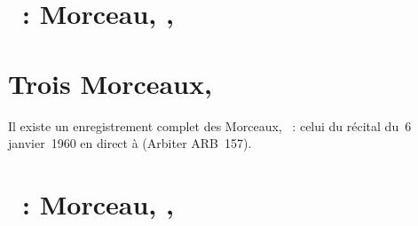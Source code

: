 \section{\ifChrono \Scriabine{}~: \fi
Morceau,  , }
\label{\thesection}

\begin{workitemize}
 \item{}
 \begin{perfitemize}
  \item{}
 \end{perfitemize}
\end{workitemize}

\section*{%
Trois Morceaux, }

Il existe un enregistrement complet des Morceaux, ~: celui du
récital du~6 janvier~1960 en direct à \MSHM (Arbiter ARB~157).

\section{\ifChrono \Scriabine{}~: \fi
Morceau,  , }
\label{\thesection}

